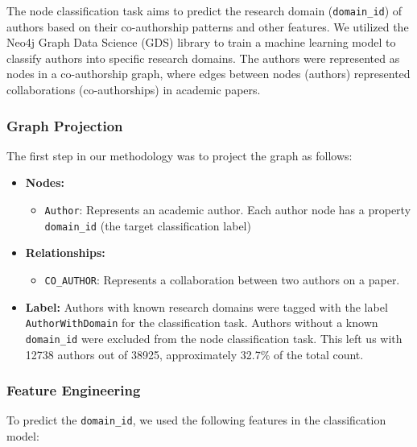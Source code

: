 \documentclass[conference, 12pt]{IEEEtran}
\begin{document}
The node classification task aims to predict the research domain (\texttt{domain\_id}) of authors based on their co-authorship patterns and other features. We utilized the Neo4j Graph Data Science (GDS) library to train a machine learning model to classify authors into specific research domains. The authors were represented as nodes in a co-authorship graph, where edges between nodes (authors) represented collaborations (co-authorships) in academic papers.

\subsubsection{Graph Projection}
The first step in our methodology was to project the graph as follows:
\begin{itemize}
  \item \textbf{Nodes:} 
    \begin{itemize}
      \item \texttt{Author}: Represents an academic author. Each author node has a property \texttt{domain\_id} (the target classification label)
    \end{itemize}
  \item \textbf{Relationships:} 
    \begin{itemize}
      \item \texttt{CO\_AUTHOR}: Represents a collaboration between two authors on a paper.
    \end{itemize}
  \item \textbf{Label:} Authors with known research domains were tagged with the label \texttt{AuthorWithDomain} for
   the classification task. Authors without a known \texttt{domain\_id} were excluded from the node classification task.
   This left us with 12738 authors out of 38925, approximately 32.7\% of the total count.
\end{itemize}


\subsubsection{Feature Engineering}
To predict the \texttt{domain\_id}, we used the following features in the classification model:
\end{document}
